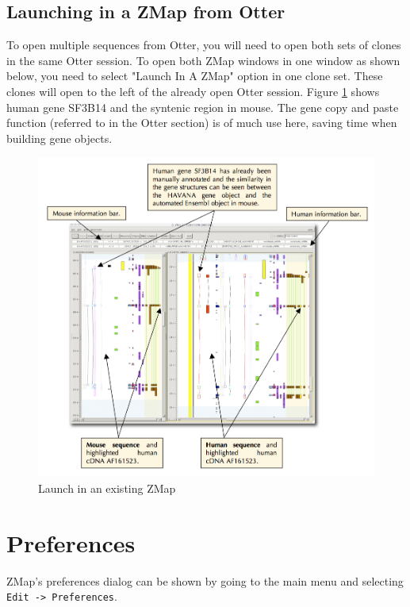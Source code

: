 \documentclass[letterpaper]{article}
\newcounter{Figure}
\begin{document}
\subsection{Launching in a ZMap from Otter}
To open multiple sequences from Otter, you will need to open both sets of clones in the same Otter session. To open both ZMap windows in one window as shown below, you need to select "Launch In A ZMap" option in one clone set. These clones will open to the left of the already open Otter session. Figure \ref{img_launch_in_zmap} shows human gene SF3B14 and the syntenic region in mouse. The gene copy and paste function (referred to in the Otter section) is of much use here, saving time when building gene objects.

\begin{figure}
\centering
\color[rgb]{0.30980393,0.5058824,0.7411765}
\includegraphics[width=15.231cm]{img_launch_in_zmap.png}
\caption{Launch in an existing ZMap}
\label{img_launch_in_zmap}
\end{figure}


\clearpage
\section{Preferences} \label{sec_preferences}
ZMap's preferences dialog can be shown by going to the main menu and selecting \lstinline{Edit -> Preferences}.
\end{document}
